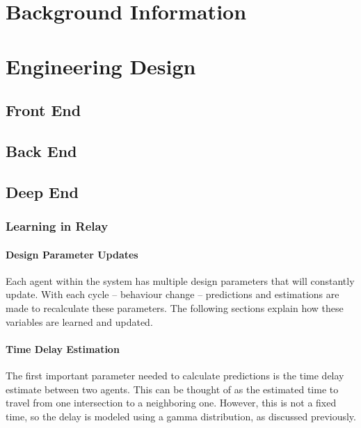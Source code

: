 \documentclass{report}
\begin{document}


\dotableofcontents

\newpage
\doublespacing
{}

\chapter{Background Information}
\setlength{\parindent}{1cm}

\newpage
\chapter{Engineering Design}

\section{Front End}

\section{Back End}

\section{Deep End}

\subsection{Learning in Relay}
\subsubsection{Design Parameter Updates}

Each agent within the system has multiple design parameters that will constantly update. With each cycle -- behaviour change -- predictions and estimations are made to recalculate these parameters. 
The following sections explain how these variables are learned and updated.

\subsubsection{Time Delay Estimation}
The first important parameter needed to calculate predictions is the time delay estimate between two agents. 
This can be thought of as the estimated time to travel from one intersection to a neighboring one. 
However, this is not a fixed time, so the delay is modeled using a gamma distribution, as discussed previously. 
\end{document}
